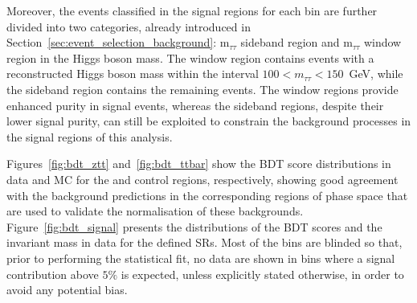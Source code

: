   
Moreover, the events classified in the signal regions for each \pth bin are further divided into two categories, already introduced in Section~\ref{sec:event_selection_background}: $\text{m}_{\tau \tau}$ sideband region and $\text{m}_{\tau \tau}$ window region in the Higgs boson mass. The window region contains events with a reconstructed Higgs boson mass within the interval $100 < m_{\tau\tau} < 150$~GeV, while the sideband region contains the remaining events. The window regions provide enhanced purity in signal events, whereas the sideband regions, despite their lower signal purity, can still be exploited to constrain the background processes in the signal regions of this analysis.

Figures~\ref{fig:bdt_ztt} and~\ref{fig:bdt_ttbar} show the BDT score distributions in data and MC for the \ztautau and \ttbar control regions, respectively, showing good agreement with the background predictions in the corresponding regions of phase space that are used to validate the normalisation of these backgrounds. Figure~\ref{fig:bdt_signal} presents the distributions of the \ttH BDT scores and the invariant mass in data for the defined SRs. Most of the bins are blinded so that, prior to performing the statistical fit, no data are shown in bins where a signal contribution above $5\%$ is expected, unless explicitly stated otherwise, in order to avoid any potential bias.

